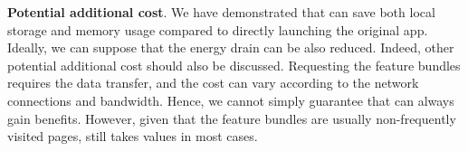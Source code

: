 \noindent \textbf{Potential additional cost}. We have demonstrated that  \nickName{} can save both local storage and memory usage compared to directly launching the original app. Ideally, we can suppose that the energy drain can be also reduced. Indeed, other potential additional cost should also be discussed. Requesting the feature bundles requires the data transfer, and the cost can vary according to the network connections and bandwidth. Hence, we cannot simply guarantee that \nickName{} can always gain benefits. However, given that the feature bundles are usually non-frequently visited pages, \nickName{} still takes values in most cases.
